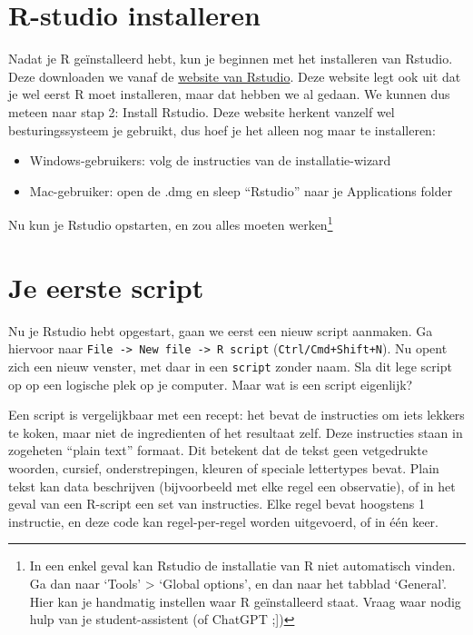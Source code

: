 \documentclass[
  a4paper,
]{scrbook}
\theoremstyle{definition}
\theoremstyle{remark}
\begin{document}
\hypertarget{r-studio-installeren}{%
\section{R-studio installeren}\label{r-studio-installeren}}

Nadat je R geïnstalleerd hebt, kun je beginnen met het installeren van
Rstudio. Deze downloaden we vanaf de
\href{https://posit.co/download/rstudio-desktop/}{website van Rstudio}.
Deze website legt ook uit dat je wel eerst R moet installeren, maar dat
hebben we al gedaan. We kunnen dus meteen naar stap 2: Install Rstudio.
Deze website herkent vanzelf wel besturingssysteem je gebruikt, dus hoef
je het alleen nog maar te installeren:

\begin{itemize}
\item
  Windows-gebruikers: volg de instructies van de installatie-wizard
\item
  Mac-gebruiker: open de .dmg en sleep ``Rstudio'' naar je Applications
  folder
\end{itemize}

Nu kun je Rstudio opstarten, en zou alles moeten werken\footnote{In een
  enkel geval kan Rstudio de installatie van R niet automatisch vinden.
  Ga dan naar `Tools' \textgreater{} `Global options', en dan naar het
  tabblad `General'. Hier kan je handmatig instellen waar R
  geïnstalleerd staat. Vraag waar nodig hulp van je student-assistent
  (of ChatGPT ;{]})}

\hypertarget{je-eerste-script}{%
\section{Je eerste script}\label{je-eerste-script}}

Nu je Rstudio hebt opgestart, gaan we eerst een nieuw script aanmaken.
Ga hiervoor naar
\texttt{File\ -\textgreater{}\ New\ file\ -\textgreater{}\ R\ script}
(\texttt{Ctrl/Cmd+Shift+N}). Nu opent zich een nieuw venster, met daar
in een \texttt{script} zonder naam. Sla dit lege script op op een
logische plek op je computer. Maar wat is een script eigenlijk?

Een script is vergelijkbaar met een recept: het bevat de instructies om
iets lekkers te koken, maar niet de ingredienten of het resultaat zelf.
Deze instructies staan in zogeheten ``plain text'' formaat. Dit betekent
dat de tekst geen vetgedrukte woorden, cursief, onderstrepingen, kleuren
of speciale lettertypes bevat. Plain tekst kan data beschrijven
(bijvoorbeeld met elke regel een observatie), of in het geval van een
R-script een set van instructies. Elke regel bevat hoogstens 1
instructie, en deze code kan regel-per-regel worden uitgevoerd, of in
één keer.
\end{document}
